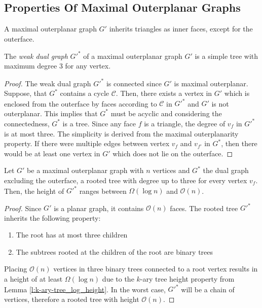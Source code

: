 \subsection{Properties Of Maximal Outerplanar Graphs}
\begin{lemma}
	A maximal outerplanar graph $G'$ inherits triangles as inner faces, except for the outerface.
\end{lemma}
\begin{lemma}\label{l:outerplanar-dual-tree-degree-3}
	The \emph{weak dual graph} $G'^*$ of a maximal outerplanar graph $G'$ is a simple tree with maximum degree 3 for any vertex.
\end{lemma}
\begin{proof}
	The weak dual graph $G'^*$ is connected since $G'$ is maximal outerplanar. Suppose, that $G^*$ contains a cycle $\mathcal{C}$. Then, there exists a vertex in $G'$ which is enclosed from the outerface by faces according to $\mathcal{C}$ in $G'^*$ and $G'$ is not outerplanar. This implies that $G^*$ must be acyclic and considering the connectedness, $G^*$ is a tree. Since any face $f$ is a triangle, the degree of $v_f$ in $G'^*$ is at most three. The simplicity is derived from the maximal outerplanarity property. If there were multiple edges between vertex $v_f$ and $v_{f'}$ in $G^*$, then there would be at least one vertex in $G'$ which does not lie on the outerface.
\end{proof}
\begin{lemma}
	Let $G'$ be a maximal outerplanar graph with $n$ vertices and $G^*$ the dual graph excluding the outerface, a rooted tree with degree up to three for every vertex $v_f$. Then, the height of $G'^*$ ranges between $\Omega(\log n)$ and $\mathcal{O}(n)$.
\end{lemma}
\begin{proof}
	Since $G'$ is a planar graph, it contains $\mathcal{O}(n)$ faces. The rooted tree $G'^*$ inherits the following property:
	\begin{enumerate}
		\item The root has at most three children
		\item The subtrees rooted at the children of the root are binary trees
	\end{enumerate}
	Placing $\mathcal{O}(n)$ vertices in three binary trees connected to a root vertex results in a height of at least $\Omega(\log n)$ due to the $k$-ary tree height property from Lemma \ref{l:k-ary-tree_log_height}. In the worst case, $G'^*$ will be a chain of vertices, therefore a rooted tree with height $\mathcal{O}(n)$.
\end{proof}

